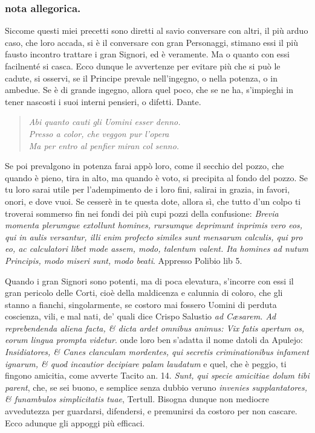 \documentclass[11pt,a6paper]{article}
\newcommand{\literaryquote}[1]{%
\kern -6pt  \begin{verse}
    {\footnotesize \it #1}
  \end{verse}\kern -2pt%
}
\begin{document}
\subsubsection{nota allegorica.}
{\footnotesize
Siccome questi miei precetti sono diretti al savio
conversare con altri, il più arduo caso, che loro
accada, si è il conversare con gran Personaggi,
stimano essi il più fausto incontro trattare i gran Signori,
ed è veramente. Ma o quanto con essi facilnenté si
casca. Ecco dunque le avvertenze per evitare più
che si può le cadute, si osservi, se il Principe prevale
nell'ingegno, o nella potenza, o in ambedue.
Se è di grande ingegno, allora quel poco, che se ne
ha, s'impieghi in tener nascosti i suoi interni pensieri,
o difetti. Dante.

\literaryquote{
Abi quanto cauti gli Uomini esser denno.\\
 Presso a color, che veggon pur l'opera\\
Ma per entro al penfier miran col senno.}

Se poi prevalgono in potenza farai appò loro,
come il secchio del pozzo, che quando è pieno,
tira in alto, ma quando è voto, si precipita al fondo
del pozzo. Se tu loro sarai utile per l'adempimento
de i loro fini, salirai in grazia, in favori, onori, e
dove vuoi. Se cesserè in te questa dote, allora sì,
che tutto d'un colpo ti troverai sommerso fin nei
fondi dei più cupi pozzi della confusione: \textit{Brevia
momenta plerumgue extollunt homines, rursumque
deprimunt inprimis vero eos, qui in aulis versantur,
illi enim profecto similes sunt mensarum calculis,
qui pro eo, ac calculatori libet mode assem, modo,
talentum valent. Ita homines ad nutum Principis,
modo miseri sunt, modo beati}. Appresso Polibio
lib 5.

Quando i gran Signori sono potenti, ma di poca
elevatura, s'incorre con essi il gran pericolo delle
Corti, cioè della maldicenza e calunnia di coloro,
che gli stanno a fianchi, singolarmente, se costoro
mai fossero Uomini di perduta coscienza, vili,
e mal nati, de' quali dice Crispo Salustio \textit{ad Cæsarem.
 Ad reprebendenda aliena facta, \& dicta ardet
 omnibus animus: Vix fatis apertum os, eorum
 lingua prompta videtur}. onde loro ben s'adatta il
nome datoli da Apulejo: \textit{Insidiatores, \& Canes
clanculam mordentes, qui secretis criminationibus
infament ignarum, \& quod incautior decipiare palam
laudatum} e quel, che è peggio, ti fingono
amicitia, come avverte Tacito an. 14. \textit{Sunt, qui
specie amicitiae dolum tibi parent}, che, se sei buono,
e semplice senza dubbio veruno \textit{invenies supplantatores,
 \& funambulos simplicitatis tuae}, Tertull. Bisogna
dunque non mediocre avvedutezza per guardarsi,
difendersi, e premunirsi da costoro per non
cascare. Ecco adunque gli appoggi più efficaci.

}
\end{document}

